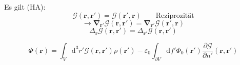 \documentclass[titlepage,11pt,a4paper,ngerman]{report}
\newcommand{\tx}[1]{\textrm{#1}}
\newcommand{\dd}{\tx{d}}
\newcommand{\gre}{\mathcal{G}}
\renewcommand{\Phi}{\varPhi}
\renewcommand{\vec}[1]{\boldsymbol{#1}}
\renewcommand{\epsilon}{\varepsilon}
\newcommand{\rbox}[1]{\begin{tcolorbox}[colback=white,colframe=red!75!black]#1\end{tcolorbox}}
\begin{document}
Es gilt (HA):
\begin{equation*}
\gre(\vec{r},\vec{r}') = \gre(\vec{r}',\vec{r}) \qquad \tx{Reziprozität}
\end{equation*}
\begin{equation*}
\rightarrow \vec{\nabla}_{\vec{r}'} \gre(\vec{r},\vec{r}') = \vec{\nabla}_{\vec{r}'} \gre(\vec{r}',\vec{r})
\end{equation*}
\begin{equation*}
\Delta_{\vec{r}} \gre(\vec{r},\vec{r}') = \Delta_{\vec{r}'} \gre(\vec{r},\vec{r}')
\end{equation*}

\rbox{\begin{equation*}
\Phi(\vec{r}) = \int_V \dd^3 r' \gre(\vec{r},\vec{r}') \rho(\vec{r}') - \epsilon_0 \int_{\partial V} \dd f' \Phi_0(\vec{r}') \frac{\partial \gre}{\partial n'} (\vec{r},\vec{r}')
\end{equation*}}





\end{document}
